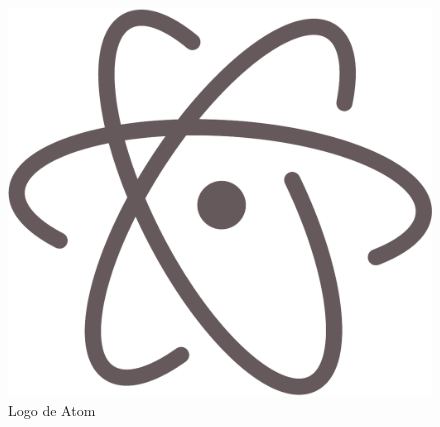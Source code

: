 \begin{figure}[!h]
\begin{minipage}[c]{0.4\textwidth}
  \includegraphics[scale=0.15]
  {textures/images/tools/atom.pdf}
\caption{Logo de Atom}\label{atom}
\end{minipage}
\end{figure}


